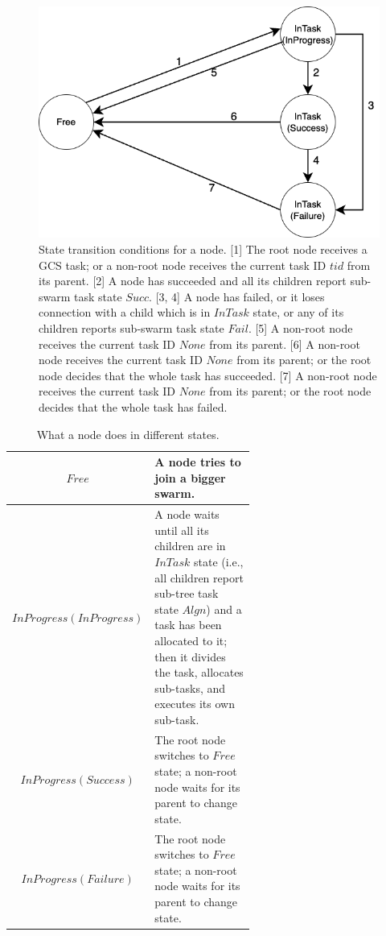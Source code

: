 \begin{figure}[htbp]
  \centering
  \includegraphics[width=0.7\linewidth]{rsc/node_state_machine.png}
  \caption[State transitions of a node.]
  {State transition conditions for a node.
  [1] The root node receives a GCS task;
  or a non-root node receives the current task ID $tid$ from its parent.
  [2] A node has succeeded and all its children report sub-swarm task state $Succ$.
  [3, 4] A node has failed,
  or it loses connection with a child which is in $InTask$ state,
  or any of its children reports sub-swarm task state $Fail$.
  [5] A non-root node receives the current task ID $None$ from its parent.
  [6] A non-root node receives the current task ID $None$ from its parent;
  or the root node decides that the whole task has succeeded.
  [7] A non-root node receives the current task ID $None$ from its parent;
  or the root node decides that the whole task has failed.
  }
  \label{fig:node_state_machine}
\end{figure}

\begin{table}[htbp]
\centering
\caption[States of a node.]
{What a node does in different states.}
\label{tbl:node_state_doing}
\begin{tabular}{c|p{0.6\linewidth}}
  \hline
  $Free$ & A node tries to join a bigger swarm. \\
  \hline
  $InProgress(InProgress)$ & A node waits until all its children are in $InTask$ state
            (i.e., all children report sub-tree task state $Algn$)
            and a task has been allocated to it;
            then it divides the task,
            allocates sub-tasks, and executes its own sub-task. \\
  \hline
  $InProgress(Success)$ & The root node switches to $Free$ state;
                          a non-root node waits for its parent to change state. \\
  \hline
  $InProgress(Failure)$ & The root node switches to $Free$ state;
                          a non-root node waits for its parent to change state. \\
  \hline
\end{tabular}
\end{table}

